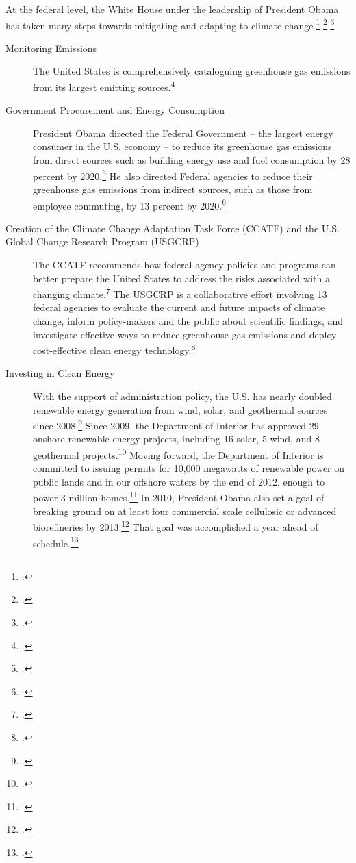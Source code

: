 At the federal level, the White House under the leadership of President Obama has taken many steps towards mitigating and adapting to climate change.\footcite[][]{WHcc2013} \footcite[][]{WHadaptation2013} \footcite[][]{WHenergy}
\begin{description}
	\item [Monitoring Emissions] The United States is comprehensively cataloguing greenhouse gas emissions from its largest emitting sources.\footcite[][]{GHGReporting}
	\item [Government Procurement and Energy Consumption] President Obama directed the Federal Government – the largest energy consumer in the U.S. economy – to reduce its greenhouse gas emissions from direct sources such as building energy use and fuel consumption by 28 percent by 2020.\footcite[][]{FedEmissionReduction2010} He also directed Federal agencies to reduce their greenhouse gas emissions from indirect sources, such as those from employee commuting, by 13 percent by 2020.\footcite[][]{FedEmissionReduction2010}
	\item [Creation of the Climate Change Adaptation Task Force (CCATF) and the U.S. Global Change Research Program (USGCRP)] The CCATF recommends how federal agency policies and programs can better prepare the United States to address the risks associated with a changing climate.\footcite[][]{WHadaptation2013} The USGCRP is a collaborative effort involving 13 federal agencies to evaluate the current and future impacts of climate change, inform policy-makers and the public about scientific findings, and investigate effective ways to reduce greenhouse gas emissions and deploy cost-effective clean energy technology.\footcite[][]{USGCRP}
	\item [Investing in Clean Energy] With the support of administration policy, the U.S. has nearly doubled renewable energy generation from wind, solar, and geothermal sources since 2008.\footcite[][]{WHEnergyStrategy} Since 2009, the Department of Interior has approved 29 onshore renewable energy projects, including 16 solar, 5 wind, and 8 geothermal projects.\footcite[][]{WHEnergyStrategy} Moving forward, the Department of Interior is committed to issuing permits for 10,000 megawatts of renewable power on public lands and in our offshore waters by the end of 2012, enough to power 3 million homes.\footcite[][]{DOIWindPower} In 2010, President Obama also set a goal of breaking ground on at least four commercial scale cellulosic or advanced biorefineries by 2013.\footcite[][]{WHEnergyStrategy} That goal was accomplished a year ahead of schedule.\footcite[][]{WHEnergyStrategy}

\end{description}
